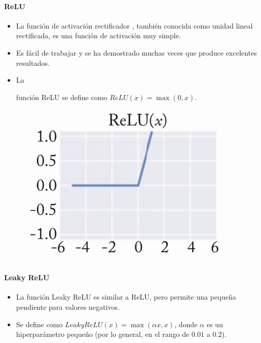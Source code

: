 \paragraph{ReLU}
\begin{itemize}
\item La función de activación rectificador \cite{glorot2011deep}, también conocida como unidad lineal rectificada, es una función de activación muy simple.
\item Es fácil de trabajar y se ha demostrado muchas veces que produce excelentes resultados.
\item La

función ReLU se define como $ReLU(x) = \max(0, x)$.
\end{itemize}

\begin{figure}[htb]
	\centering
	 \includegraphics[scale=0.3]{pics/relu.png}
\end{figure}

\paragraph{Leaky ReLU}
\begin{itemize}
\item La función Leaky ReLU es similar a ReLU, pero permite una pequeña pendiente para valores negativos.
\item Se define como $LeakyReLU(x) = \max(\alpha x, x)$, donde $\alpha$ es un hiperparámetro pequeño (por lo general, en el rango de $0.01$ a $0.2$).
\end{itemize}


